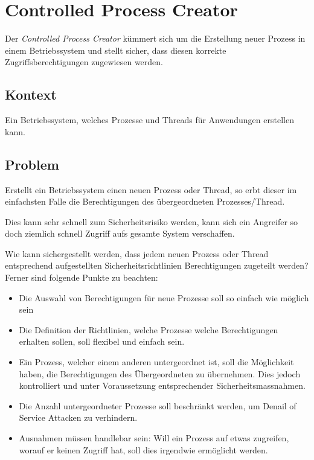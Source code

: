 \section{Controlled Process Creator}
\label{sec:controlled-process-creator}

Der \emph{Controlled Process Creator} kümmert sich um die Erstellung neuer Prozess in einem Betriebssystem und stellt sicher, dass diesen korrekte Zugriffsberechtigungen zugewiesen werden.

\subsection*{Kontext}
Ein Betriebssystem, welches Prozesse und Threads für Anwendungen erstellen kann.

\subsection*{Problem}
Erstellt ein Betriebssystem einen neuen Prozess oder Thread, so erbt dieser im einfachsten Falle die Berechtigungen des übergeordneten Prozesses/Thread.

Dies kann sehr schnell zum Sicherheitsrisiko werden, kann sich ein Angreifer so doch ziemlich schnell Zugriff aufs gesamte System verschaffen.

Wie kann sichergestellt werden, dass jedem neuen Prozess oder Thread entsprechend aufgestellten Sicherheitsrichtlinien Berechtigungen zugeteilt werden? Ferner sind folgende Punkte zu beachten:

\begin{itemize}
	\item Die Auswahl von Berechtigungen für neue Prozesse soll so einfach wie möglich sein
	\item Die Definition der Richtlinien, welche Prozesse welche Berechtigungen erhalten sollen, soll flexibel und einfach sein.
	\item Ein Prozess, welcher einem anderen untergeordnet ist, soll die Möglichkeit haben, die Berechtigungen des Übergeordneten zu übernehmen. Dies jedoch kontrolliert und unter Voraussetzung entsprechender Sicherheitsmassnahmen.
	\item Die Anzahl untergeordneter Prozesse soll beschränkt werden, um Denail of Service Attacken zu verhindern.
	\item Ausnahmen müssen handlebar sein: Will ein Prozess auf etwas zugreifen, worauf er keinen Zugriff hat, soll dies irgendwie ermöglicht werden.
\end{itemize}


